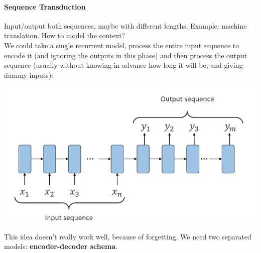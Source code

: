 \documentclass[10pt]{report}
\begin{document}
\paragraph{Sequence Transduction} Input/output both sequences, maybe with different lengths. Example: machine translation. How to model the context?\\
We could take a single recurrent model, process the entire input sequence to encode it (and ignoring the outputs in this phase) and then process the output sequence (usually without knowing in advance how long it will be, and giving dummy inputs):
\begin{center}
	\includegraphics[scale=0.5]{107.png}
\end{center}
This idea doesn't really work well, because of forgetting. We need two separated models: \textbf{encoder-decoder schema}.
\end{document}
